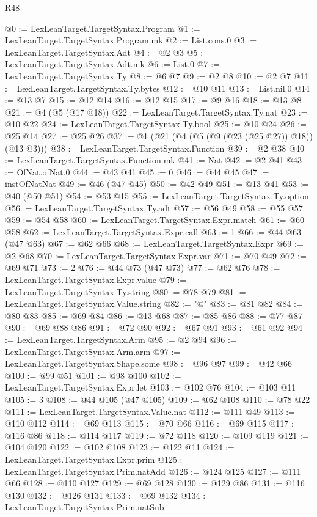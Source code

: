 \begin{lexlean}{R48}
\begin{coremodule}
@0 := LexLeanTarget.TargetSyntax.Program
@1 := LexLeanTarget.TargetSyntax.Program.mk
@2 := List.cons.{0}
@3 := LexLeanTarget.TargetSyntax.Adt
@4 := @2 @3
@5 := LexLeanTarget.TargetSyntax.Adt.mk
@6 := List.{0}
@7 := LexLeanTarget.TargetSyntax.Ty
@8 := @6 @7
@9 := @2 @8
@10 := @2 @7
@11 := LexLeanTarget.TargetSyntax.Ty.bytes
@12 := @10 @11
@13 := List.nil.{0}
@14 := @13 @7
@15 := @12 @14
@16 := @12 @15
@17 := @9 @16
@18 := @13 @8
@21 := @4 (@5 (@17 @18))
@22 := LexLeanTarget.TargetSyntax.Ty.nat
@23 := @10 @22
@24 := LexLeanTarget.TargetSyntax.Ty.bool
@25 := @10 @24
@26 := @25 @14
@27 := @25 @26
@37 := @1 (@21 (@4 (@5 (@9 (@23 (@25 @27)) @18)) (@13 @3)))
@38 := LexLeanTarget.TargetSyntax.Function
@39 := @2 @38
@40 := LexLeanTarget.TargetSyntax.Function.mk
@41 := Nat
@42 := @2 @41
@43 := OfNat.ofNat.{0}
@44 := @43 @41
@45 := 0
@46 := @44 @45
@47 := instOfNatNat
@49 := @46 (@47 @45)
@50 := @42 @49
@51 := @13 @41
@53 := @40 (@50 @51)
@54 := @53 @15
@55 := LexLeanTarget.TargetSyntax.Ty.option
@56 := LexLeanTarget.TargetSyntax.Ty.adt
@57 := @56 @49
@58 := @55 @57
@59 := @54 @58
@60 := LexLeanTarget.TargetSyntax.Expr.match
@61 := @60 @58
@62 := LexLeanTarget.TargetSyntax.Expr.call
@63 := 1
@66 := @44 @63 (@47 @63)
@67 := @62 @66
@68 := LexLeanTarget.TargetSyntax.Expr
@69 := @2 @68
@70 := LexLeanTarget.TargetSyntax.Expr.var
@71 := @70 @49
@72 := @69 @71
@73 := 2
@76 := @44 @73 (@47 @73)
@77 := @62 @76
@78 := LexLeanTarget.TargetSyntax.Expr.value
@79 := LexLeanTarget.TargetSyntax.Ty.string
@80 := @78 @79
@81 := LexLeanTarget.TargetSyntax.Value.string
@82 := "@"
@83 := @81 @82
@84 := @80 @83
@85 := @69 @84
@86 := @13 @68
@87 := @85 @86
@88 := @77 @87
@90 := @69 @88 @86
@91 := @72 @90
@92 := @67 @91
@93 := @61 @92
@94 := LexLeanTarget.TargetSyntax.Arm
@95 := @2 @94
@96 := LexLeanTarget.TargetSyntax.Arm.arm
@97 := LexLeanTarget.TargetSyntax.Shape.some
@98 := @96 @97
@99 := @42 @66
@100 := @99 @51
@101 := @98 @100
@102 := LexLeanTarget.TargetSyntax.Expr.let
@103 := @102 @76
@104 := @103 @11
@105 := 3
@108 := @44 @105 (@47 @105)
@109 := @62 @108
@110 := @78 @22
@111 := LexLeanTarget.TargetSyntax.Value.nat
@112 := @111 @49
@113 := @110 @112
@114 := @69 @113
@115 := @70 @66
@116 := @69 @115
@117 := @116 @86
@118 := @114 @117
@119 := @72 @118
@120 := @109 @119
@121 := @104 @120
@122 := @102 @108
@123 := @122 @11
@124 := LexLeanTarget.TargetSyntax.Expr.prim
@125 := LexLeanTarget.TargetSyntax.Prim.natAdd
@126 := @124 @125
@127 := @111 @66
@128 := @110 @127
@129 := @69 @128
@130 := @129 @86
@131 := @116 @130
@132 := @126 @131
@133 := @69 @132
@134 := LexLeanTarget.TargetSyntax.Prim.natSub

\end{coremodule}
\end{lexlean}
